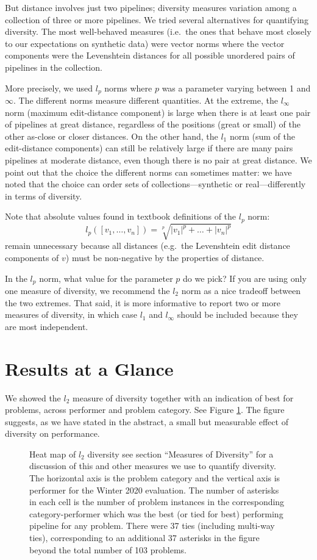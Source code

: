 \documentclass{article}
\begin{document}
But distance involves just two pipelines; diversity measures variation
among a collection of three or more pipelines.  We tried several
alternatives for quantifying diversity.  The most well-behaved
measures (i.e.\ the ones that behave most closely to our expectations
on synthetic data) were vector norms where the vector components were
the Levenshtein distances for all possible unordered pairs of
pipelines in the collection.

More precisely, we used $l_p$ norms where $p$ was a parameter varying
between 1 and $\infty$.  The different norms measure different
quantities.  At the extreme, the $l_\infty$ norm (maximum
edit-distance component) is large when there is at least one pair of
pipelines at great distance, regardless of the positions (great or
small) of the other as-close or closer distances.  On the other hand,
the $l_1$ norm (sum of the edit-distance components) can still be
relatively large if there are many pairs pipelines at moderate
distance, even though there is no pair at great distance.  We point
out that the choice the different norms can sometimes matter: we have
noted that the choice can order sets of collections---synthetic or
real---differently in terms of diversity.

Note that absolute values found in textbook definitions of the $l_p$
norm:
$$l_p([v_1,\dots,v_n]) = \sqrt[p]{|v_1|^p + \dots + |v_n|^p}$$ remain
unnecessary because all distances (e.g.\ the Levenshtein edit distance
components of $v$) must be non-negative by the properties of distance.

In the $l_p$ norm, what value for the parameter $p$ do we pick?  If
you are using only one measure of diversity, we recommend the $l_2$
norm as a nice tradeoff between the two extremes.  That said, it is
more informative to report two or more measures of diversity, in which
case $l_1$ and $l_\infty$ should be included because they are most
independent.

\section{Results at a Glance}
\label{sec:glance}
We showed the $l_2$ measure of diversity together with an indication
of best for problems, across performer and problem category.  See
Figure \ref{fig:heatmap}.  The figure suggests, as we have stated in
the abstract, a small but measurable effect of diversity on
performance.

\begin{figure}
\caption{Heat map of $l_2$ diversity see section ``Measures of
  Diversity'' for a discussion of this and other measures we use to
  quantify diversity.  The horizontal axis is the problem category and
  the vertical axis is performer for the Winter 2020 evaluation.  The
  number of asterisks in each cell is the number of problem instances
  in the corresponding category-performer which was the best (or tied
  for best) performing pipeline for any problem.  There were 37 ties
  (including multi-way ties), corresponding to an additional 37
  asterisks in the figure beyond the total number of 103 problems.}
\label{fig:heatmap}
\end{figure}
\end{document}
